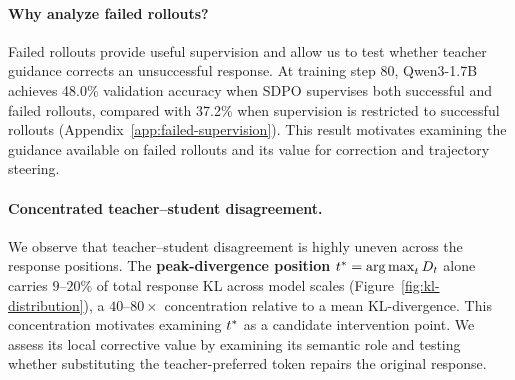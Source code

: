 \vspace{-0.1cm}\paragraph{Why analyze failed rollouts?} Failed rollouts provide useful supervision and allow us to test whether teacher guidance corrects an unsuccessful response. At training step 80, Qwen3-1.7B achieves 48.0\% validation accuracy when SDPO supervises both successful and failed rollouts, compared with 37.2\% when supervision is restricted to successful rollouts (Appendix~\ref{app:failed-supervision}). This result motivates examining the guidance available on failed rollouts and its value for correction and trajectory steering.


\vspace{-0.15cm}\paragraph{Concentrated teacher--student disagreement.}
We observe that teacher--student disagreement is highly uneven across the response positions. The \textbf{peak-divergence position} $t^{*}=\operatorname*{arg\,max}_t D_t$ alone carries $9$--$20\%$ of total response KL across model scales (Figure~\ref{fig:kl-distribution}), a $40$--$80\times$ concentration relative to a mean KL-divergence. This concentration motivates examining $t^{*}$ as a candidate intervention point. We assess its local corrective value by examining its semantic role and testing whether substituting the teacher-preferred token repairs the original response.




